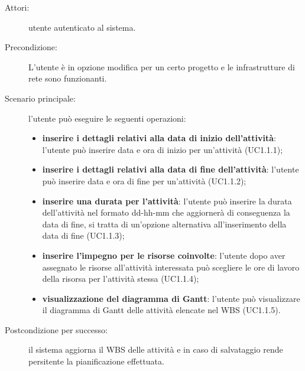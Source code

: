 \begin{description}
\item[Attori:]{utente autenticato al sistema.}
\item[Precondizione:]{L\textquoteright{}utente \`{e} in opzione modifica per un certo progetto e le infrastrutture di rete sono funzionanti.}
\item[Scenario principale:]{l\textquoteright{}utente pu\`{o} eseguire le seguenti operazioni:
	\begin{itemize}
	\item \textbf{inserire i dettagli relativi alla data di inizio dell\textquoteright{}attivit\`{a}}: l\textquoteright{}utente pu\`{o} inserire data e ora di inizio per un\textquoteright{}attivit\`{a} (UC1.1.1);
	\item \textbf{inserire i dettagli relativi alla data di fine dell\textquoteright{}attivit\`{a}}: l\textquoteright{}utente pu\`{o} inserire data e ora di fine per un\textquoteright{}attivit\`{a} (UC1.1.2);
	\item \textbf{inserire una durata per l\textquoteright{}attivit\`{a}}: l\textquoteright{}utente pu\`{o} inserire la durata dell\textquoteright{}attivit\`{a} nel formato dd-hh-mm che aggiorner\`{a} di conseguenza la data di fine, si tratta di un\textquoteright{}opzione alternativa all\textquoteright{}inserimento della data di fine (UC1.1.3);
	\item \textbf{inserire l\textquoteright{}impegno per le risorse coinvolte}: l\textquoteright{}utente dopo aver assegnato le risorse all\textquoteright{}attivit\`{a} interessata pu\`{o} scegliere le ore di lavoro della risorsa per l\textquoteright{}attivit\`{a} stessa (UC1.1.4);
	\item \textbf{visualizzazione del diagramma di Gantt}: l\textquoteright{}utente pu\`{o} visualizzare il diagramma di Gantt delle attivit\`{a} elencate nel WBS (UC1.1.5).
	\end{itemize}}
\item[Postcondizione per successo:]{il sistema aggiorna il WBS delle attivit\`{a} e in caso di salvataggio rende persitente la pianificazione effettuata.}
\end{description}

